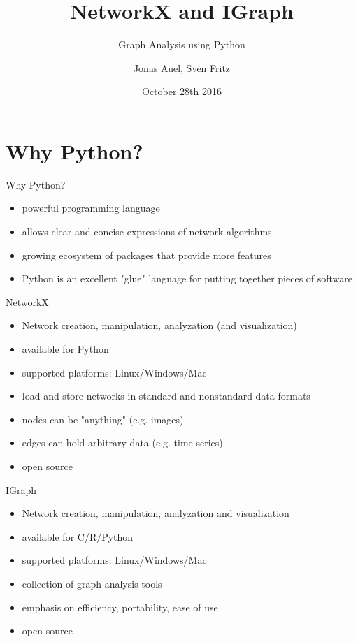 \documentclass[12pt]{beamer}
\author{Jonas Auel, Sven Fritz}
\title{NetworkX and IGraph}
\subtitle{Graph Analysis using Python}
\institute{Uni Mannheim}
\date{October 28th 2016}
\begin{document}
	\maketitle
	\section{Why Python?}
	\begin{frame}{Why Python?}
		\begin{itemize}
			\item powerful programming language
			\item allows clear and concise expressions of network algorithms
			\item growing ecosystem of packages that provide more features
			\item Python is an excellent "glue" language for putting together pieces of software
		\end{itemize}
	\end{frame}
	\begin{frame}{NetworkX}
		\begin{itemize}
			\item Network creation, manipulation, analyzation (and visualization)
			\item available for Python
			\item supported platforms: Linux/Windows/Mac
			\item load and store networks in standard and nonstandard data formats
			\item nodes can be "anything" (e.g. images)
			\item edges can hold arbitrary data (e.g. time series)
			\item open source
		\end{itemize}
	\end{frame}
	\begin{frame}{IGraph}
		\begin{itemize}
			\item Network creation, manipulation, analyzation and visualization
			\item available for C/R/Python
			\item supported platforms: Linux/Windows/Mac 
			\item collection of graph analysis tools
			\item emphasis on efficiency, portability, ease of use
			\item open source
		\end{itemize}
	\end{frame}
\end{document}
